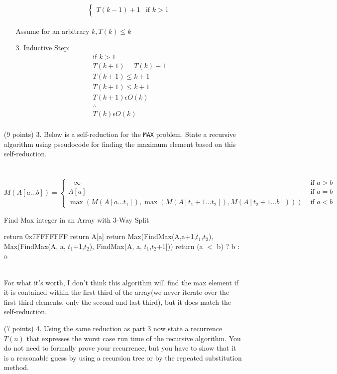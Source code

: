 \documentclass[paper=a4,fontsize=11pt]{article}
\begin{document}
\begin{enumerate}
\begin{enumerate}
\[\begin{cases}
        T(k-1) + 1 & \text{if $k > 1$}
    \end{cases}
\]
\\Assume for an arbitrary $k, T(k) \leq k$
\item[3.] Inductive Step:
\begin{gather*}
\text{if $k > 1$}\\
T(k + 1) = T(k) + 1\\
T(k + 1) \leq k + 1\\  
T(k + 1) \leq k + 1\\
T(k + 1) \epsilon O(k)\\
\therefore\\
T(k) \epsilon O(k)\\
\end{gather*}
\end{enumerate}
\item [(9 points) 3.] Below is a self-reduction for the \texttt{MAX} problem. State a recursive algorithm using pseudocode for finding the maximum element based on this self-reduction.\\\\\
\[
M(A[a\dots b]) = \left\{
\begin{array}{cl}
-\infty & \textrm{ if } a > b\\
A[a] & \textrm{ if } a = b\\
\max(M(A[a\dots t_1]), \max(M(A[t_1+1\dots t_2]), M(A[t_2+1\dots b]))) & \textrm{ if } a < b
\end{array}
\right.
\]
\begin{algorithm}
\caption{Find Max integer in an Array with 3-Way Split}
\label{array-max}
\begin{algorithmic}[1]
        \State return 0x7FFFFFFF
        \State return A[a]
        \State return Max(FindMax(A,a+1,$t_1$,$t_2$), Max(FindMax(A, a, $t_1$+1,$t_2$), FindMax(A, a, $t_1$,$t_2$+1]))
    \EndIf
\EndProcedure
{}
    return (a $<$ b) ? b : a
\EndProcedure
\end{algorithmic}
\end{algorithm}\\
For what it's worth, I don't think this algorithm will find the max element if it is contained within the first third of the array(we never iterate over the first third elements, only the second and last third), but it does match the self-reduction.
\item [(7 points) 4.] Using the same reduction as part 3 now state a recurrence $T(n)$ that expresses the worst case run time of the recursive algorithm. You do not need to formally prove your recurrence, but you have to show that it is a reasonable guess by using a recursion tree or by the repeated substitution method.

\end{enumerate}
\end{document}
